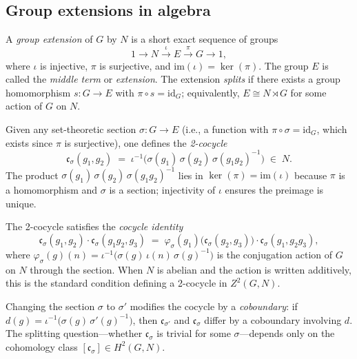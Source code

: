 \documentclass[11pt]{article}
\newcommand{\im}{\mathrm{im}}
\newcommand{\id}{\mathrm{id}}
\newcommand{\cocy}{\mathfrak{c}}
\begin{document}
\subsection{Group extensions in algebra}\label{sec:bg-algebra}

A \emph{group extension} of $G$ by $N$ is a short exact sequence of groups
\begin{equation}\label{eq:ses}
  1 \longrightarrow N \xrightarrow{\;\iota\;} E \xrightarrow{\;\pi\;} G \longrightarrow 1,
\end{equation}
where $\iota$ is injective, $\pi$ is surjective, and $\im(\iota) = \ker(\pi)$.
The group $E$ is called the \emph{middle term} or \emph{extension}.  The extension
\emph{splits} if there exists a group homomorphism $s : G \to E$ with $\pi \circ s =
\id_G$; equivalently, $E \cong N \rtimes G$ for some action of $G$ on $N$.

Given any set-theoretic section $\sigma : G \to E$ (i.e., a function with
$\pi \circ \sigma = \id_G$, which exists since $\pi$ is surjective), one defines the
\emph{2-cocycle}
\begin{equation}\label{eq:cocycle-def}
  \cocy_\sigma(g_1, g_2) \;=\; \iota^{-1}\!\bigl(\sigma(g_1)\,\sigma(g_2)\,
  \sigma(g_1 g_2)^{-1}\bigr) \;\in\; N.
\end{equation}
The product $\sigma(g_1)\,\sigma(g_2)\,\sigma(g_1 g_2)^{-1}$ lies in $\ker(\pi) =
\im(\iota)$ because $\pi$ is a homomorphism and $\sigma$ is a section; injectivity
of $\iota$ ensures the preimage is unique.

The 2-cocycle satisfies the \emph{cocycle identity}
\begin{equation}\label{eq:cocycle-identity}
  \cocy_\sigma(g_1, g_2) \cdot \cocy_\sigma(g_1 g_2, g_3) \;=\;
  \varphi_\sigma(g_1)\bigl(\cocy_\sigma(g_2, g_3)\bigr) \cdot
  \cocy_\sigma(g_1, g_2 g_3),
\end{equation}
where $\varphi_\sigma(g)(n) = \iota^{-1}\bigl(\sigma(g)\,\iota(n)\,\sigma(g)^{-1}\bigr)$
is the conjugation action of $G$ on $N$ through the section.  When $N$ is abelian and
the action is written additively, this is the standard condition defining a 2-cocycle
in $Z^2(G, N)$.

Changing the section $\sigma$ to $\sigma'$ modifies the cocycle by a \emph{coboundary}:
if $d(g) = \iota^{-1}\bigl(\sigma(g)\,\sigma'(g)^{-1}\bigr)$, then
$\cocy_{\sigma'}$ and $\cocy_\sigma$ differ by a coboundary involving $d$.  The
splitting question---whether $\cocy_\sigma$ is trivial for some $\sigma$---depends
only on the cohomology class $[\cocy_\sigma] \in H^2(G, N)$.
\end{document}
